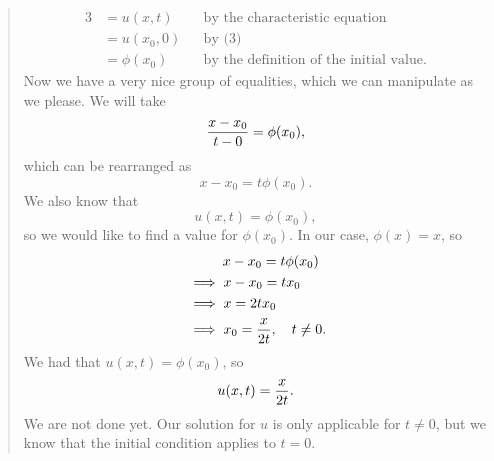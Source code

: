\begin{quote}
\begin{alignat*}{3}
&= u(x,t) &&\text{by the characteristic equation}\\
&= u(x_{0},0) &&\text{by (3)}\\
&= \phi(x_{0}) &&\text{by the definition of the initial value}.
\end{alignat*}
Now we have a very nice group of equalities, which we can manipulate as we please. We will take
\[
{x-x_{0}\over t-0} = \phi(x_{0}),
\]
which can be rearranged as
\[
x-x_{0} = t\phi(x_{0}).
\]
We also know that
\[
u(x,t) = \phi(x_{0}),
\]
so we would like to find a value for $\phi(x_{0})$. In our case, $\phi(x) = x$, so
\begin{align*}
&\qquad\ \ x-x_{0} = t\phi(x_{0})\\
&\implies x-x_{0} = tx_{0}\\
&\implies x = 2tx_{0}\\
&\implies x_{0} = {x\over 2t},\quad t\neq0.
\end{align*}
We had that $u(x,t) = \phi(x_{0})$, so
\[
u(x,t) = {x\over2t}.
\]
We are not done yet. Our solution for $u$ is only applicable for $t\neq0$, but we know that the initial
condition applies to $t=0$.
\end{quote}
